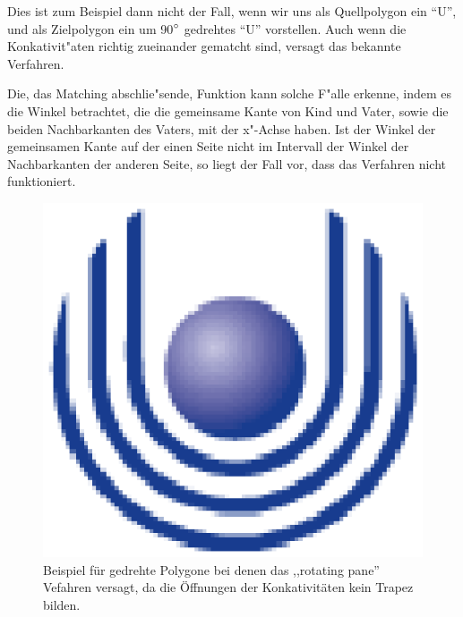 Dies ist zum Beispiel dann nicht der Fall, wenn wir uns als Quellpolygon ein "`U"', und als Zielpolygon ein um 90$\degree$ gedrehtes "`U"' vorstellen. Auch wenn die Konkativit"aten richtig zueinander gematcht sind, versagt das bekannte Verfahren.

Die, das Matching abschlie"sende, Funktion kann solche F"alle erkenne, indem es die Winkel betrachtet, die die gemeinsame Kante von Kind und Vater, sowie die beiden Nachbarkanten des Vaters, mit der x"-Achse haben. Ist der Winkel der gemeinsamen Kante auf der einen Seite nicht im  Intervall der Winkel der Nachbarkanten der anderen Seite, so liegt der Fall vor, dass das Verfahren nicht funktioniert.

\begin{figure}
	\centering
	\includegraphics{feu_logo2.eps}
	\caption[Beispiel für gedrehte Polygone]{Beispiel für gedrehte Polygone bei denen das ,,rotating pane'' Vefahren versagt, da die Öffnungen der Konkativitäten kein Trapez bilden.}
	\label{fig:gedrehteMatches}
\end{figure}


